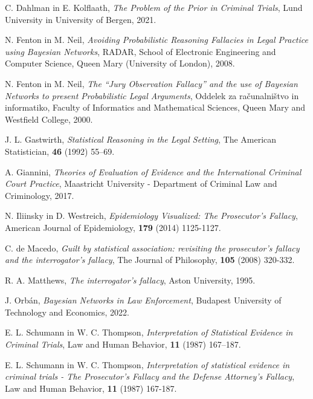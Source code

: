 \documentclass[12pt,a4paper]{amsart}
\theoremstyle{definition} %
\theoremstyle{plain} %
\begin{document}
\begin{thebibliography}{99}
        C. Dahlman in E. Kolflaath, \emph{The Problem of the Prior in Criminal Trials}, Lund University in University of Bergen, 2021.

        N. Fenton in M. Neil, \emph{Avoiding Probabilistic Reasoning Fallacies in Legal Practice using Bayesian Networks}, RADAR, School of Electronic Engineering and Computer Science, Queen Mary (University of London), 2008.

        N. Fenton in M. Neil, \emph{The “Jury Observation Fallacy” and the use of Bayesian Networks to present Probabilistic Legal Arguments}, Oddelek za računalništvo in informatiko, Faculty of Informatics and Mathematical Sciences, Queen Mary and Westfield College, 2000.

        J. L. Gastwirth, \emph{Statistical Reasoning in the Legal Setting}, The American Statistician, \textbf{46} (1992) 55–69.

        A. Giannini, \emph{Theories of Evaluation of Evidence and the International Criminal Court Practice}, Maastricht University - Department of Criminal Law and Criminology, 2017.

        N. Iliinsky in D. Westreich, \emph{Epidemiology Visualized: The Prosecutor’s Fallacy}, American Journal of Epidemiology, \textbf{179} (2014) 1125-1127.

        C. de Macedo, \emph{Guilt by statistical association: revisiting the prosecutor’s fallacy and the interrogator’s fallacy}, The Journal of Philosophy, \textbf{105} (2008) 320-332.

        R. A. Matthews, \emph{The interrogator’s fallacy}, Aston University, 1995.

        J. Orbán, \emph{Bayesian Networks in Law Enforcement}, Budapest University of Technology and Economics, 2022.

        E. L. Schumann in W. C. Thompson, \emph{Interpretation of Statistical Evidence in Criminal Trials}, Law and Human Behavior, \textbf{11} (1987) 167–187.

        E. L. Schumann in W. C. Thompson, \emph{Interpretation of statistical evidence in criminal trials - The Prosecutor's Fallacy and the Defense Attorney's Fallacy}, Law and Human Behavior, \textbf{11} (1987) 167-187.


\end{thebibliography}
\end{document}
